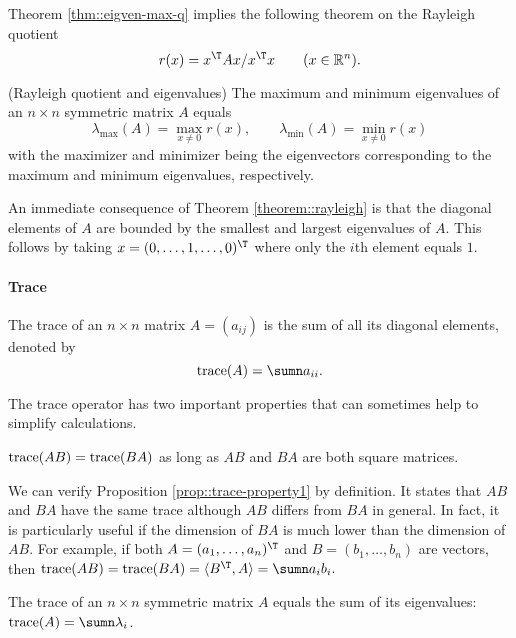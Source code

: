 Theorem \ref{thm::eigven-max-q} implies the following theorem on the  Rayleigh quotient
$$
r(x)=x^{\T}Ax/x^{\T}x \qquad  (x\in \mathbb{R}^n).
$$


\begin{theorem}
(Rayleigh quotient and eigenvalues) \label{theorem::rayleigh}
The maximum and minimum eigenvalues of  an $n\times n$ symmetric matrix $A$ equals
\[
\lambda_{\max}(A)=\max_{x\neq0}r(x),\qquad\lambda_{\min}(A)=\min_{x\neq0}r(x)
\]
with the maximizer and minimizer being the eigenvectors corresponding to the maximum and minimum eigenvalues, respectively. 
\end{theorem}

An immediate consequence of Theorem \ref{theorem::rayleigh} is that the diagonal elements of $A$ are bounded by the smallest and largest eigenvalues of $A$. This follows by taking $x = (0, \ldots, 1, \ldots, 0)^{\T}$ where only the $i$th element equals $1$. 

\paragraph*{Trace}

The trace of an $n\times n$ matrix $A=(a_{ij})$ is the sum of all
its diagonal elements, denoted by 
$$
\text{trace}(A)=\sumn a_{ii}.
$$

The trace operator has two important properties that can sometimes
help to simplify calculations.

\begin{proposition}\label{prop::trace-property1}
$\textup{trace}(AB)=\textup{trace}(BA)$ as long as $AB$ and $BA$
are both square matrices.
\end{proposition}

We can verify
Proposition \ref{prop::trace-property1} by definition. It states that $AB$ and $BA$ have the same trace although $AB$ differs from $BA$ in general. In fact, it is particularly useful if the dimension of $BA$
is much lower than the dimension of $AB$. For example, if both $A=(a_{1},\ldots,a_{n})^{\T}$
and $B=(b_{1},\ldots,b_{n})$ are vectors, then $\text{trace}(AB)=\text{trace}(BA)=\langle B^{\T},A \rangle =\sumn a_{i}b_{i}.$ 

\begin{proposition}\label{proposition::trace-eigenvalues}
The trace of an $n\times n$ symmetric matrix $A$ equals the sum
of its eigenvalues: $\textup{trace}(A)=\sumn\lambda_{i}$. 
\end{proposition}

